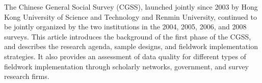 The Chinese General Social Survey (CGSS), launched jointly since 2003 by Hong Kong University of Science and Technology and Renmin University, continued to be jointly organized by the two institutions in the 2004, 2005, 2006, and 2008 surveys. This article introduces the background of the first phase of the CGSS, and describes the research agenda, sample designs, and fieldwork implementation strategies. It also provides an assessment of data quality for different types of fieldwork implementation through scholarly networks, government, and survey research firms.